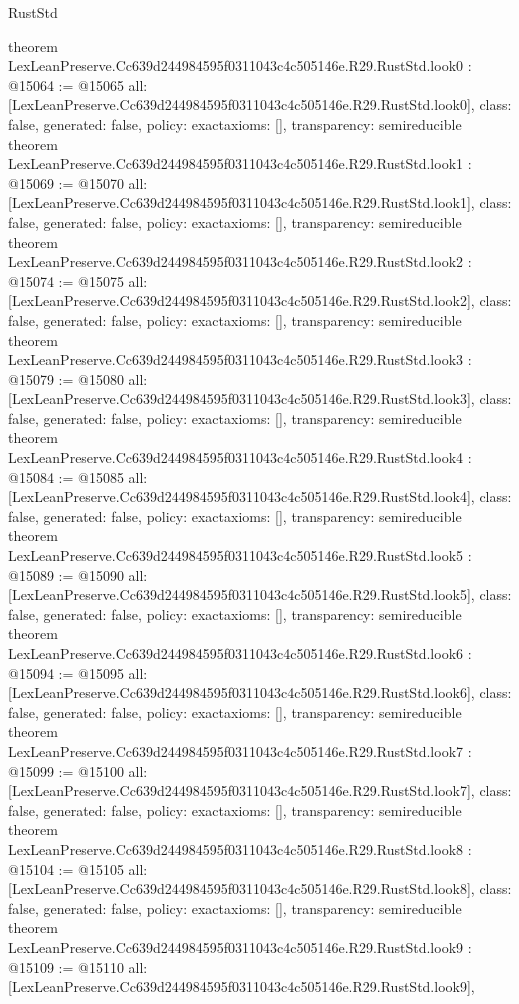 \begin{lexlean}{RustStd}
\begin{coremodule}
{}
theorem LexLeanPreserve.Cc639d244984595f0311043c4c505146e.R29.RustStd.look0 : @15064 := @15065 {
  all: [LexLeanPreserve.Cc639d244984595f0311043c4c505146e.R29.RustStd.look0],
  class: false,
  generated: false,
  policy: exact{axioms: []},
  transparency: semireducible
}
theorem LexLeanPreserve.Cc639d244984595f0311043c4c505146e.R29.RustStd.look1 : @15069 := @15070 {
  all: [LexLeanPreserve.Cc639d244984595f0311043c4c505146e.R29.RustStd.look1],
  class: false,
  generated: false,
  policy: exact{axioms: []},
  transparency: semireducible
}
theorem LexLeanPreserve.Cc639d244984595f0311043c4c505146e.R29.RustStd.look2 : @15074 := @15075 {
  all: [LexLeanPreserve.Cc639d244984595f0311043c4c505146e.R29.RustStd.look2],
  class: false,
  generated: false,
  policy: exact{axioms: []},
  transparency: semireducible
}
theorem LexLeanPreserve.Cc639d244984595f0311043c4c505146e.R29.RustStd.look3 : @15079 := @15080 {
  all: [LexLeanPreserve.Cc639d244984595f0311043c4c505146e.R29.RustStd.look3],
  class: false,
  generated: false,
  policy: exact{axioms: []},
  transparency: semireducible
}
theorem LexLeanPreserve.Cc639d244984595f0311043c4c505146e.R29.RustStd.look4 : @15084 := @15085 {
  all: [LexLeanPreserve.Cc639d244984595f0311043c4c505146e.R29.RustStd.look4],
  class: false,
  generated: false,
  policy: exact{axioms: []},
  transparency: semireducible
}
theorem LexLeanPreserve.Cc639d244984595f0311043c4c505146e.R29.RustStd.look5 : @15089 := @15090 {
  all: [LexLeanPreserve.Cc639d244984595f0311043c4c505146e.R29.RustStd.look5],
  class: false,
  generated: false,
  policy: exact{axioms: []},
  transparency: semireducible
}
theorem LexLeanPreserve.Cc639d244984595f0311043c4c505146e.R29.RustStd.look6 : @15094 := @15095 {
  all: [LexLeanPreserve.Cc639d244984595f0311043c4c505146e.R29.RustStd.look6],
  class: false,
  generated: false,
  policy: exact{axioms: []},
  transparency: semireducible
}
theorem LexLeanPreserve.Cc639d244984595f0311043c4c505146e.R29.RustStd.look7 : @15099 := @15100 {
  all: [LexLeanPreserve.Cc639d244984595f0311043c4c505146e.R29.RustStd.look7],
  class: false,
  generated: false,
  policy: exact{axioms: []},
  transparency: semireducible
}
theorem LexLeanPreserve.Cc639d244984595f0311043c4c505146e.R29.RustStd.look8 : @15104 := @15105 {
  all: [LexLeanPreserve.Cc639d244984595f0311043c4c505146e.R29.RustStd.look8],
  class: false,
  generated: false,
  policy: exact{axioms: []},
  transparency: semireducible
}
theorem LexLeanPreserve.Cc639d244984595f0311043c4c505146e.R29.RustStd.look9 : @15109 := @15110 {
  all: [LexLeanPreserve.Cc639d244984595f0311043c4c505146e.R29.RustStd.look9],
}
\end{coremodule}
\end{lexlean}

